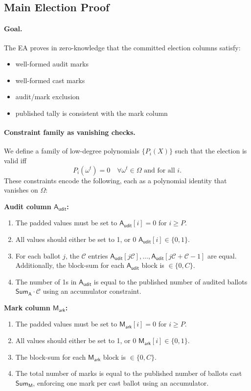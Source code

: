\documentclass{llncs}
\begin{document}
\subsection{Main Election Proof}
\paragraph{Goal.}
The EA proves in zero-knowledge that the committed election columns satisfy:
\begin{itemize}
\item well-formed audit marks
\item well-formed cast marks
\item audit/mark exclusion
\item published tally is consistent with the mark column
\end{itemize}


\paragraph{Constraint family as vanishing checks.}
We define a family of low-degree polynomials $\{P_i(X)\}$ such that the election is valid iff
\begin{equation*}
P_i(\omega^t)=0 \quad \forall \omega^t\in\Omega \text{ and for all } i.
\end{equation*}
These constraints encode the following, each as a polynomial identity that vanishes on $\Omega$:

\noindent\textbf{Audit column $\mathsf{A_{udit}}$:}
\begin{enumerate}
  \item The padded values must be set to $\mathsf{A_{udit}}[i]=0$ for $i\ge P$.
  \item All values should either be set to 1, or 0 $\mathsf{A_{udit}}[i]\in\{0,1\}$.
  \item For each ballot $j$, the $\mathcal{C}$ entries $\mathsf{A_{udit}}[j\mathcal{C}],\dots,\mathsf{A_{udit}}[j\mathcal{C}+\mathcal{C}-1]$ are equal.
  Additionally, the block-sum for each $\mathsf{A_{udit}}$ block is $\in\{0,C\}$.
  \item The number of 1s in $\mathsf{A_{udit}}$ is equal to the published number of audited ballots $\mathsf{Sum_A}\cdot \mathcal{C}$ using an accumulator constraint.
\end{enumerate}

\noindent\textbf{Mark column $\mathsf{M_{ark}}$:}
\begin{enumerate}
  \item The padded values must be set to $\mathsf{M_{ark}}[i]=0$ for $i\ge P$.
  \item All values should either be set to 1, or 0 $\mathsf{M_{ark}}[i]\in\{0,1\}$.
  \item The block-sum for each $\mathsf{M_{ark}}$ block is $\in\{0,C\}$.
  \item The total number of marks is equal to the published number of ballots cast $\mathsf{Sum_M}$, enforcing one mark per cast ballot using an accumulator.
\end{enumerate}
\end{document}
